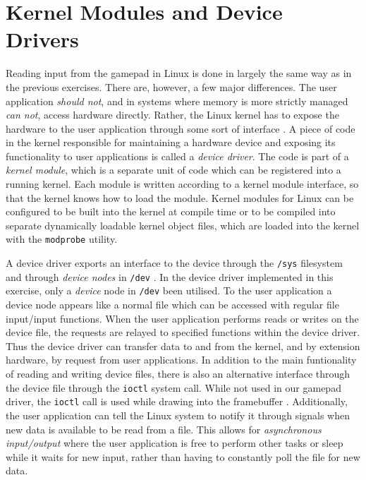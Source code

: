 \section{Kernel Modules and Device Drivers}

Reading input from the gamepad in Linux is done in largely the same way as in
the previous exercises. There are, however, a few major differences. The user
application \emph{should not}, and in systems where memory is more strictly
managed \emph{can not}, access hardware directly. Rather, the Linux kernel has
to expose the hardware to the user application through some sort of interface
\cite{ldd}. A piece of code in the kernel responsible for maintaining a
hardware device and exposing its functionality to user applications is called a
\emph{device driver}. The code is part of a \emph{kernel module}, which is a
separate unit of code which can be registered into a running kernel. Each module
is written according to a kernel module interface, so that the kernel knows how
to load the module. Kernel modules for Linux can be configured to be built into
the kernel at compile time or to be compiled into separate dynamically loadable
kernel object files, which are loaded into the kernel with the \texttt{modprobe}
utility.

A device driver exports an interface to the device through the \texttt{/sys}
filesystem and through \emph{device nodes} in \texttt{/dev} \cite{ldd}. In the
device driver implemented in this exercise, only a \emph{device} node in
\texttt{/dev} been utilised. To the user application a device node appears like
a normal file which can be accessed with regular file input/input functions.
When the user application performs reads or writes on the device file, the
requests are relayed to specified functions within the device driver. Thus the
device driver can transfer data to and from the kernel, and by extension
hardware, by request from user applications. In addition to the main
funtionality of reading and writing device files, there is also an alternative
interface through the device file through the \texttt{ioctl} system call. While
not used in our gamepad driver, the \texttt{ioctl} call is used while drawing
into the framebuffer \cite{TDT4528Compendium}. Additionally, the user
application can tell the Linux system to notify it through signals when new data
is available to be read from a file. This allows for \emph{asynchronous
input/output} where the user application is free to perform other tasks or sleep
while it waits for new input, rather than having to constantly poll the file for
new data.

